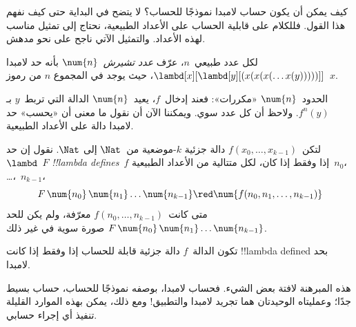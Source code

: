 \documentclass[../../../include/open-logic-section]{subfiles}
\begin{document}

كيف يمكن أن يكون حساب لامبدا نموذجًا للحساب؟ لا يتضح في البداية حتى
كيف نفهم هذا القول. فللكلام على قابلية الحساب على الأعداد الطبيعية،
نحتاج إلى تمثيل مناسب لهذه الأعداد. والتمثيل الآتي ناجح على نحو مدهش.

\begin{defn}
لكل عدد طبيعي~$n$، عرّف \emph{عدد تشيرش}~$\num{n}$ بأنه حد لامبدا
$\lambd[x][\lambd[y][(x(x(x(\dots x(y)))))]]$، حيث يوجد في المجموع
$n$ من رموز~$x$.
\end{defn}

الحدود~$\num{n}$ «مكررات»: فعند إدخال~$f$، يعيد~$\num{n}$ الدالة التي
تربط~$y$ بـ$f^n(y)$. ولاحظ أن كل عدد سوي. ويمكننا الآن أن نقول ما معنى
أن «يحسب» حد لامبدا دالة على الأعداد الطبيعية.

\begin{defn}
لتكن~$f(x_0, \dots, x_{k-1})$ دالة جزئية $k$-موضعية من~$\Nat$ إلى
$\Nat$. نقول إن حد~$\lambd$~$F$ \emph{!!{lambda define}s}~$f$ إذا وفقط
إذا كان، لكل متتالية من الأعداد الطبيعية~$n_0$، \dots،~$n_{k-1}$،
\[
F\, \num{n_0}\, \num{n_1} \dots \num{n_{k-1}} \red \num{f(n_0, n_1, \dots,
  n_{k-1})}
\]
متى كانت~$f(n_0, \dots, n_{k-1})$ معرّفة، ولم يكن للحد
$F\, \num{n_0}\, \num{n_1} \dots \num{n_{k-1}}$ صورة سوية في غير ذلك.
\end{defn}

\begin{thm}
تكون الدالة~$f$ دالة جزئية قابلة للحساب إذا وفقط إذا كانت
!!{lambda defined} بحد لامبدا.
\end{thm}

\begin{explain}
هذه المبرهنة لافتة بعض الشيء. فحساب لامبدا، بوصفه نموذجًا للحساب، حساب
بسيط جدًا؛ وعمليتاه الوحيدتان هما تجريد لامبدا والتطبيق!{} ومع ذلك،
يمكن بهذه الموارد القليلة تنفيذ أي إجراء حسابي.
\end{explain}
\end{document}
